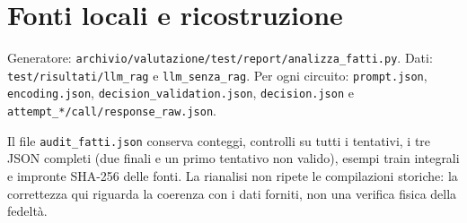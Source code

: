 \documentclass[a4paper,10pt]{article}
\begin{document}
\section*{Fonti locali e ricostruzione}
{\small\raggedright Generatore: \texttt{archivio/valutazione/test/report/analizza\_fatti.py}. Dati: \texttt{test/risultati/llm\_rag} e \texttt{llm\_senza\_rag}. Per ogni circuito: \texttt{prompt.json}, \texttt{encoding.json}, \texttt{decision\_validation.json}, \texttt{decision.json} e \texttt{attempt\_*/call/response\_raw.json}.\par}
Il file \texttt{audit\_fatti.json} conserva conteggi, controlli su tutti i tentativi, i tre JSON completi (due finali e un primo tentativo non valido), esempi train integrali e impronte SHA-256 delle fonti. La rianalisi non ripete le compilazioni storiche: la correttezza qui riguarda la coerenza con i dati forniti, non una verifica fisica della fedeltà.\par
\end{document}
